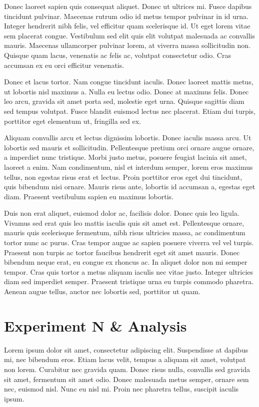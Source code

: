 Donec laoreet sapien quis consequat aliquet. Donec ut ultrices mi. Fusce dapibus tincidunt pulvinar. Maecenas rutrum odio id metus tempor pulvinar in id urna. Integer hendrerit nibh felis, vel efficitur quam scelerisque id. Ut eget lorem vitae sem placerat congue. Vestibulum sed elit quis elit volutpat malesuada ac convallis mauris. Maecenas ullamcorper pulvinar lorem, at viverra massa sollicitudin non. Quisque quam lacus, venenatis ac felis ac, volutpat consectetur odio. Cras accumsan ex eu orci efficitur venenatis.

Donec et lacus tortor. Nam congue tincidunt iaculis. Donec laoreet mattis metus, ut lobortis nisl maximus a. Nulla eu lectus odio. Donec at maximus felis. Donec leo arcu, gravida sit amet porta sed, molestie eget urna. Quisque sagittis diam sed tempus volutpat. Fusce blandit euismod lectus nec placerat. Etiam dui turpis, porttitor eget elementum ut, fringilla sed ex.

Aliquam convallis arcu et lectus dignissim lobortis. Donec iaculis massa arcu. Ut lobortis sed mauris et sollicitudin. Pellentesque pretium orci ornare augue ornare, a imperdiet nunc tristique. Morbi justo metus, posuere feugiat lacinia sit amet, laoreet a enim. Nam condimentum, nisl et interdum semper, lorem eros maximus tellus, non egestas risus erat et lectus. Proin porttitor eros eget dui tincidunt, quis bibendum nisi ornare. Mauris risus ante, lobortis id accumsan a, egestas eget diam. Praesent vestibulum sapien eu maximus lobortis.

Duis non erat aliquet, euismod dolor ac, facilisis dolor. Donec quis leo ligula. Vivamus sed erat quis leo mattis iaculis quis sit amet est. Pellentesque ornare, mauris quis scelerisque fermentum, nibh risus ultricies massa, ac condimentum tortor nunc ac purus. Cras tempor augue ac sapien posuere viverra vel vel turpis. Praesent non turpis ac tortor faucibus hendrerit eget sit amet mauris. Donec bibendum neque erat, eu congue ex rhoncus ac. In aliquet dolor non mi semper tempor. Cras quis tortor a metus aliquam iaculis nec vitae justo. Integer ultricies diam sed imperdiet semper. Praesent tristique urna eu turpis commodo pharetra. Aenean augue tellus, auctor nec lobortis sed, porttitor ut quam.

\section{Experiment N \& Analysis}
Lorem ipsum dolor sit amet, consectetur adipiscing elit. Suspendisse at dapibus mi, nec bibendum eros. Etiam lacus velit, tempus a aliquam sit amet, volutpat non lorem. Curabitur nec gravida quam. Donec risus nulla, convallis sed gravida sit amet, fermentum sit amet odio. Donec malesuada metus semper, ornare sem nec, euismod nisl. Nunc eu nisl mi. Proin nec pharetra tellus, suscipit iaculis ipsum.

